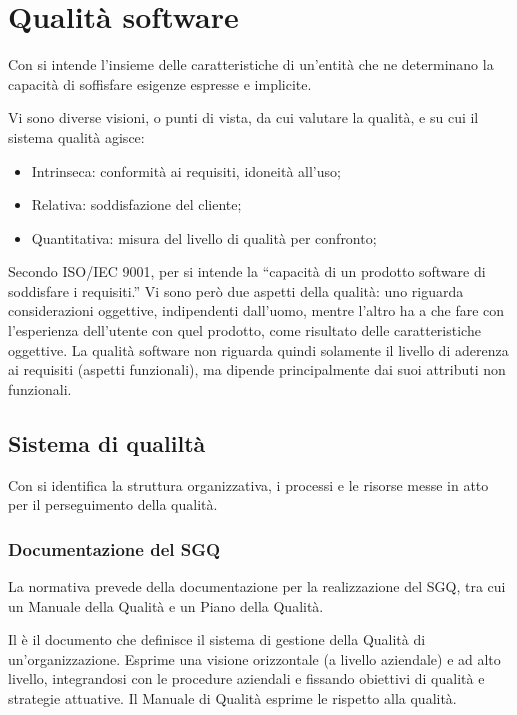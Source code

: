 \section{Qualità software}
\label{sec:qualita_software}

Con  si intende l'insieme delle caratteristiche di un'entità che
ne determinano la capacità di soffisfare esigenze espresse e implicite.

Vi sono diverse visioni, o punti di vista, da cui valutare la qualità, e su cui
il sistema qualità agisce:

\begin{itemize}
  \item Intrinseca: conformità ai requisiti, idoneità all'uso;
  \item Relativa: soddisfazione del cliente;
  \item Quantitativa: misura del livello di qualità per confronto;
\end{itemize}

Secondo ISO/IEC 9001, per  si intende la ``capacità di
un prodotto software di soddisfare i requisiti.'' Vi sono però due aspetti della
qualità: uno riguarda considerazioni oggettive, indipendenti dall'uomo, mentre
l'altro ha a che fare con l'esperienza dell'utente con quel prodotto, come
risultato delle caratteristiche oggettive. La qualità software non riguarda
quindi solamente il livello di aderenza ai requisiti (aspetti funzionali), ma
dipende principalmente dai suoi attributi non funzionali.

\subsection{Sistema di qualiltà}
\label{sub:sistema_di_qualilta}

Con  si identifica la struttura organizzativa, i
processi e le risorse messe in atto per il perseguimento della qualità.

\subsubsection{Documentazione del SGQ}
\label{ssub:documentazione_del_sgq}

La normativa prevede della documentazione per la realizzazione del SGQ, tra cui
un Manuale della Qualità e un Piano della Qualità.

Il  è il documento che definisce il sistema di
gestione della Qualità di un'organizzazione. Esprime una visione orizzontale (a
livello aziendale) e ad alto livello, integrandosi con le procedure aziendali e
fissando obiettivi di qualità e strategie attuative. Il Manuale di Qualità
esprime le  rispetto alla qualità.

